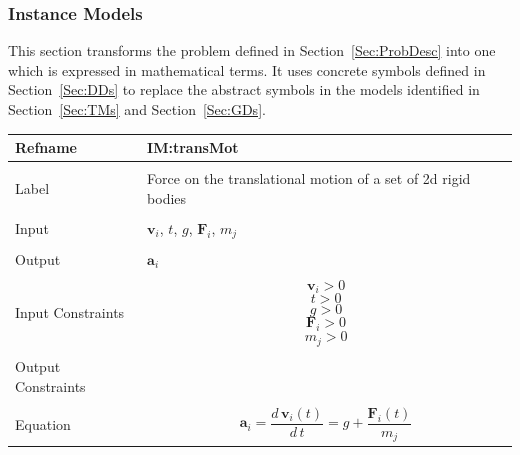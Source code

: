 \documentclass[12pt]{article}
\begin{document}
\subsubsection{Instance Models}
\label{Sec:IMs}
This section transforms the problem defined in Section~\ref{Sec:ProbDesc} into one which is expressed in mathematical terms. It uses concrete symbols defined in Section~\ref{Sec:DDs} to replace the abstract symbols in the models identified in Section~\ref{Sec:TMs} and Section~\ref{Sec:GDs}.
~\newline
\noindent \begin{minipage}{\textwidth}
\begin{tabular}{p{} p{}}
\toprule \textbf{Refname} & \textbf{IM:transMot}
\label{IM:transMot}
\\ \midrule \\
Label & Force on the translational motion of a set of 2d rigid bodies
\\ \midrule \\
Input & ${\mathbf{v}_{i}}$, $t$, $g$, ${\mathbf{F}_{i}}$, ${m_{j}}$
\\ \midrule \\
Output & ${\mathbf{a}_{i}}$
\\ \midrule \\
Input Constraints & \begin{dmath}
                    {\mathbf{v}_{i}}>0
                    \end{dmath}
                    \begin{dmath}
                    t>0
                    \end{dmath}
                    \begin{dmath}
                    g>0
                    \end{dmath}
                    \begin{dmath}
                    {\mathbf{F}_{i}}>0
                    \end{dmath}
                    \begin{dmath}
                    {m_{j}}>0
                    \end{dmath}
\\ \midrule \\
Output Constraints & 
\\ \midrule \\
Equation & \begin{dmath}
           {\mathbf{a}_{i}}=\frac{d\,{\mathbf{v}_{i}}\left(t\right)}{d\,t}=g+\frac{{\mathbf{F}_{i}}\left(t\right)}{{m_{j}}}

\end{dmath}
\end{tabular}
\end{minipage}
\end{document}
